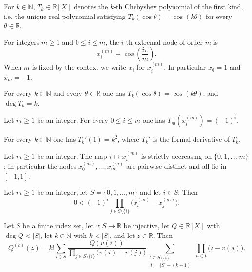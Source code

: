 \begin{definition}
For $k\in\mathbb{N}$, $T_k\in\mathbb{R}[X]$ denotes the $k$-th Chebyshev
polynomial of the first kind, i.e. the unique real polynomial satisfying
$T_k(\cos\theta)=\cos(k\theta)$ for every $\theta\in\mathbb{R}$.
\end{definition}

\begin{definition}
For integers $m\ge 1$ and $0\le i\le m$, the $i$-th extremal node of order $m$
is
\[
  x^{(m)}_i=\cos\!\left(\frac{i\pi}{m}\right).
\]
When $m$ is fixed by the context we write $x_i$ for $x^{(m)}_i$. In particular
$x_0=1$ and $x_m=-1$.
\end{definition}

\begin{proposition}
For every $k\in\mathbb{N}$ and every $\theta\in\mathbb{R}$ one has
$T_k(\cos\theta)=\cos(k\theta)$, and $\deg T_k=k$.
\end{proposition}

\begin{proposition}
Let $m\ge 1$ be an integer. For every $0\le i\le m$ one has
$T_m\!\left(x^{(m)}_i\right)=(-1)^i$.
\end{proposition}

\begin{proposition}
For every $k\in\mathbb{N}$ one has $T_k'(1)=k^2$, where $T_k'$ is the formal
derivative of $T_k$.
\end{proposition}

\begin{proposition}
Let $m\ge 1$ be an integer. The map $i\mapsto x^{(m)}_i$ is strictly decreasing
on $\{0,1,\dots,m\}$; in particular the nodes $x^{(m)}_0,\dots,x^{(m)}_m$ are
pairwise distinct and all lie in $[-1,1]$.
\end{proposition}

\begin{proposition}
Let $m\ge 1$ be an integer, let $S=\{0,1,\dots,m\}$ and let $i\in S$. Then
\[
  0<(-1)^i\prod_{j\in S\setminus\{i\}}\bigl(x^{(m)}_i-x^{(m)}_j\bigr).
\]
\end{proposition}

\begin{proposition}
Let $S$ be a finite index set, let $v:S\to\mathbb{R}$ be injective, let
$Q\in\mathbb{R}[X]$ with $\deg Q<\lvert S\rvert$, let $k\in\mathbb{N}$ with
$k<\lvert S\rvert$, and let $z\in\mathbb{R}$. Then
\[
  Q^{(k)}(z)=k!\sum_{i\in S}
    \frac{Q(v(i))}{\prod_{j\in S\setminus\{i\}}\bigl(v(i)-v(j)\bigr)}
    \sum_{\substack{t\subseteq S\setminus\{i\}\\ \lvert t\rvert=\lvert S\rvert-(k+1)}}
      \ \prod_{a\in t}\bigl(z-v(a)\bigr).
\]
\end{proposition}

